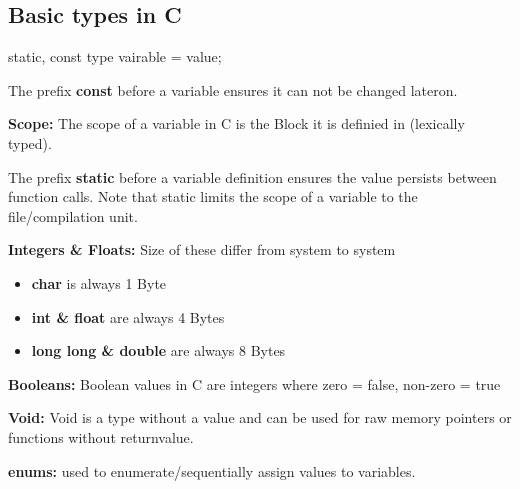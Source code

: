 \subsection{Basic types in C}

\begin{codeexample}
{static, const} type vairable = value;
\end{codeexample}

\begin{remark}
    The prefix \textbf{const} before a variable ensures it can not be changed lateron.
\end{remark}

\begin{definition}
    \textbf{Scope:} The scope of a variable in C is the Block it is definied in (lexically typed).
\end{definition}

\begin{remark}
    The prefix \textbf{static} before a variable definition ensures the value persists between function calls. Note that static limits the scope of a variable to the file/compilation unit.
\end{remark}

\begin{definition}
    \textbf{Integers \& Floats:} Size of these differ from system to system
    \begin{itemize}
        \item \textbf{char} is always 1 Byte
        \item \textbf{int \& float} are always 4 Bytes
        \item \textbf{long long \& double} are always 8 Bytes
    \end{itemize}
\end{definition}

\begin{definition}
    \textbf{Booleans:} Boolean values in C are integers where zero = false, non-zero = true
\end{definition}

\begin{definition}
    \textbf{Void:} Void is a type without a value and can be used for raw memory pointers or functions without returnvalue.
\end{definition}

\begin{definition}
    \textbf{enums:} used to enumerate/sequentially assign values to variables.
\end{definition}

